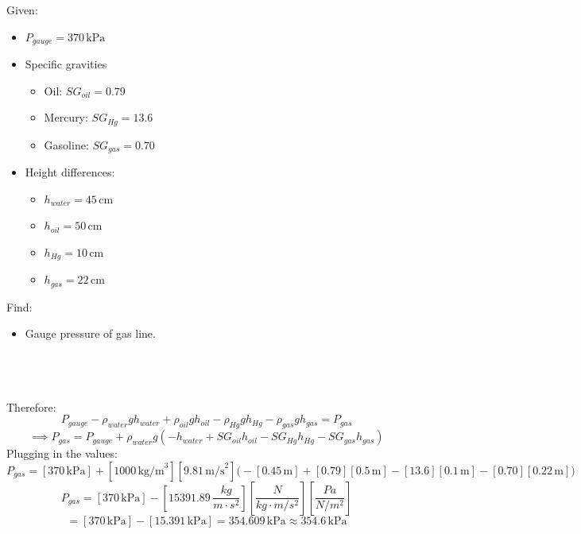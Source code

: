 \documentclass[12pt]{article}
\begin{document}
\begin{minipage}[t]{0.4\textwidth} \vspace{0pt}
Given:
\begin{itemize}
    \item $P_{gauge} = 370\,\text{kPa}$
    \item Specific gravities
    \begin{itemize}
        \item Oil: $SG_{oil} = 0.79$
        \item Mercury: $SG_{Hg} = 13.6$
        \item Gasoline: $SG_{gas} = 0.70$
    \end{itemize}
    \item Height differences:
    \begin{itemize}
        \item $h_{water} = 45\,\text{cm}$
        \item $h_{oil} = 50\,\text{cm}$
        \item $h_{Hg} = 10\,\text{cm}$
        \item $h_{gas} = 22\,\text{cm}$
    \end{itemize}
\end{itemize}
Find: 
\begin{itemize}
    \item Gauge pressure of gas line.
\end{itemize}
\end{minipage}\\\\\\
Therefore:
\[P_{gauge} - \rho_{water}gh_{water} + \rho_{oil}gh_{oil} - \rho_{Hg}gh_{Hg} - \rho_{gas}gh_{gas} = P_{gas}\]
\[\implies P_{gas} = P_{gauge} + \rho_{water}g(-h_{water} + SG_{oil}h_{oil} - SG_{Hg}h_{Hg} - SG_{gas}h_{gas})\]
Plugging in the values:
\[P_{gas} = [370\,\text{kPa}]+[1000\,\text{kg/m}^3][9.81\,\text{m/s}^2]\bigg(-[0.45\,\text{m}] + [0.79][0.5\,\text{m}] - [13.6][0.1\,\text{m}] - [0.70][0.22\,\text{m}]\bigg)\]
\[P_{gas} = [370\,\text{kPa}]-
\left[15391.89\,\frac{kg}{m\cdot s^2}\right]
\left[\frac{N}{kg \cdot m/s^2}\right]
\left[\frac{Pa}{N/m^2}\right]\]
\[= [370\,\text{kPa}]-
[15.391\,\text{kPa}] = 354.609\,\text{kPa} \approx \boxed{354.6\,\text{kPa}}\]
\end{document}
